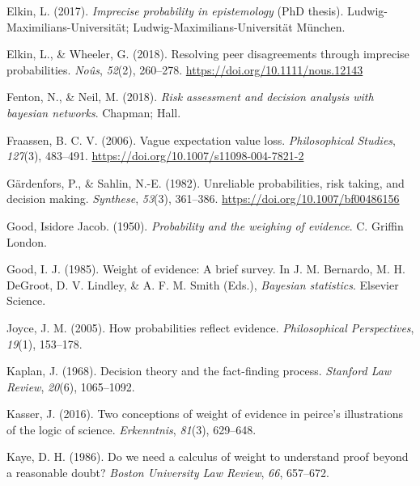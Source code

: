 \documentclass[
  10pt,
  dvipsnames,enabledeprecatedfontcommands]{scrartcl}
\newlength{\cslhangindent}
\newlength{\cslentryspacingunit} %
\newenvironment{CSLReferences}[2] %
 {%
  \setlength{\parindent}{0pt}
  \ifodd #1
  \let\oldpar\par
  \def\par{\hangindent=\cslhangindent\oldpar}
  \fi
  \setlength{\parskip}{#2\cslentryspacingunit}
 }%
 {}
\begin{document}
\begin{CSLReferences}{1}{0}
\leavevmode{}%
Elkin, L. (2017). \emph{Imprecise probability in epistemology} (PhD
thesis). Ludwig-Maximilians-Universit{ä}t;
Ludwig-Maximilians-Universität München.

\leavevmode{}%
Elkin, L., \& Wheeler, G. (2018). Resolving peer disagreements through
imprecise probabilities. \emph{Noûs}, \emph{52}(2), 260--278.
\url{https://doi.org/10.1111/nous.12143}

\leavevmode{}%
Fenton, N., \& Neil, M. (2018). \emph{Risk assessment and decision
analysis with bayesian networks}. Chapman; Hall.

\leavevmode{}%
Fraassen, B. C. V. (2006). Vague expectation value loss.
\emph{Philosophical Studies}, \emph{127}(3), 483--491.
\url{https://doi.org/10.1007/s11098-004-7821-2}

\leavevmode{}%
Gärdenfors, P., \& Sahlin, N.-E. (1982). Unreliable probabilities, risk
taking, and decision making. \emph{Synthese}, \emph{53}(3), 361--386.
\url{https://doi.org/10.1007/bf00486156}

\leavevmode{}%
Good, Isidore Jacob. (1950). \emph{Probability and the weighing of
evidence}. C. Griffin London.

\leavevmode{}%
Good, I. J. (1985). Weight of evidence: A brief survey. In J. M.
Bernardo, M. H. DeGroot, D. V. Lindley, \& A. F. M. Smith (Eds.),
\emph{Bayesian statistics}. Elsevier Science.

\leavevmode{}%
Joyce, J. M. (2005). How probabilities reflect evidence.
\emph{Philosophical Perspectives}, \emph{19}(1), 153--178.

\leavevmode{}%
Kaplan, J. (1968). Decision theory and the fact-finding process.
\emph{Stanford Law Review}, \emph{20}(6), 1065--1092.

\leavevmode{}%
Kasser, J. (2016). Two conceptions of weight of evidence in peirce's
illustrations of the logic of science. \emph{Erkenntnis}, \emph{81}(3),
629--648.

\leavevmode{}%
Kaye, D. H. (1986). Do we need a calculus of weight to understand proof
beyond a reasonable doubt? \emph{Boston University Law Review},
\emph{66}, 657--672.


\end{CSLReferences}
\end{document}
